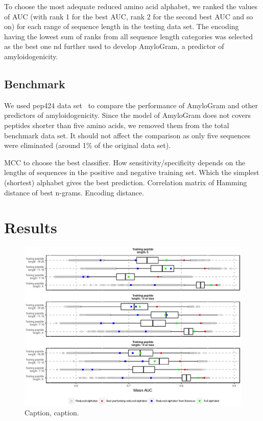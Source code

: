 \documentclass{bioinfo}
\begin{document}
\begin{methods}
To choose the most adequate reduced amino acid alphabet, we ranked the values of AUC (with rank 1 for the best AUC, rank 2 for the second best AUC and so on) for each range of sequence length in the testing data set. The encoding having the lowest sum of ranks from all sequence length categories was selected as the best one nd further used to develop AmyloGram, a predictor of amyloidogenicity.

\subsection{Benchmark}

We used pep424 data set~\cite{walsh_pasta_2014} to compare the performance of AmyloGram and other predictors of amyloidogenicity. Since the model of AmyloGram does not covers peptides shorter than five amino acids, we removed them from the total benchmark data set. It should not affect the comparison as only five sequences were eliminated (around 1\% of the original data set).

MCC to choose the best classifier.
How sensitivity/specificity depends on the lengths of sequences in the positive and negative training set.
Which the simplest (shortest) alphabet gives the best prediction.
Correlation matrix of Hamming distance of best n-grams.
Encoding distance.

\end{methods}

\section{Results}





\begin{figure}[!tpb]
\centerline{\includegraphics{figures/AUC_boxplot.eps}}
\caption{Caption, caption.}\label{fig:AUC_boxplot}
\end{figure}
\end{document}

